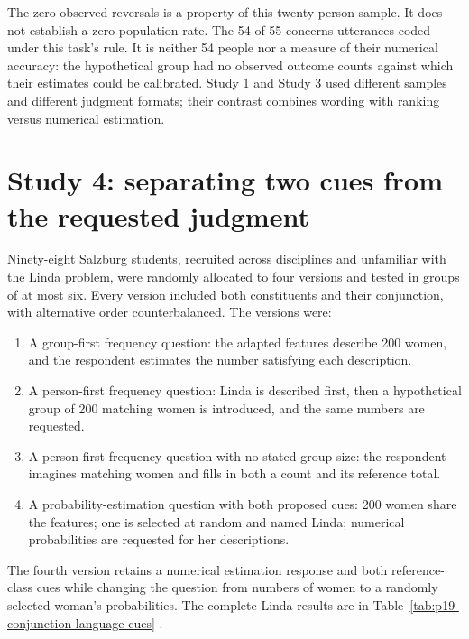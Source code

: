 The zero observed reversals is a property of this twenty-person
sample. It does not establish a zero population rate.
The 54 of 55 concerns utterances coded under this task's rule.
It is neither 54 people nor a measure of their numerical accuracy:
the hypothetical group had no observed outcome counts against
which their estimates could be calibrated.
Study 1 and Study 3 used different samples and different judgment
formats; their contrast combines wording with ranking versus
numerical estimation.

\section{Study 4: separating two cues from the requested judgment}
\label{sec:p19-conjunction-language-study-four}

Ninety-eight Salzburg students, recruited across disciplines and
unfamiliar with the Linda problem, were randomly allocated to four
versions and tested in groups of at most six. Every version included
both constituents and their conjunction, with alternative order
counterbalanced. The versions were:

\begin{enumerate}
\item A group-first frequency question: the adapted features describe
200 women, and the respondent estimates the number satisfying each
description.
\item A person-first frequency question: Linda is described first,
then a hypothetical group of 200 matching women is introduced,
and the same numbers are requested.
\item A person-first frequency question with no stated group size:
the respondent imagines matching women and fills in both a count
and its reference total.
\item A probability-estimation question with both proposed cues:
200 women share the features; one is selected at random and named
Linda; numerical probabilities are requested for her descriptions.
\end{enumerate}

The fourth version retains a numerical estimation response and both
reference-class cues while changing the question from numbers of
women to a randomly selected woman's probabilities.
The complete Linda results are in
Table~\ref{tab:p19-conjunction-language-cues}
\cite[pp.~289--292, Exhibit~3]{HertwigGigerenzer1999Conjunction}.

